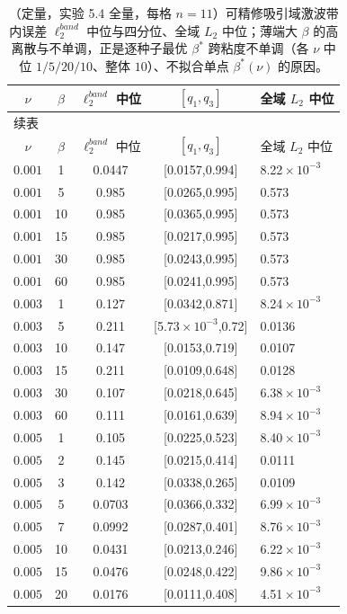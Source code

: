 \documentclass[fontset=windows,11pt]{ctexart}
\numberwithin{equation}{section}
\begin{document}
\begin{longtable}{ccccl}
\caption{（定量，实验 5.4 全量，每格 $n=11$）可精修吸引域激波带内误差 $\ell_2^{band}$ 中位与四分位、全域 $L_2$ 中位；薄端大 $\beta$ 的高离散与不单调，正是逐种子最优 $\beta^*$ 跨粘度不单调（各 $\nu$ 中位 $1/5/20/10$、整体 $10$）、不拟合单点 $\beta^*(\nu)$ 的原因。}\label{tab:app-e1}\\
\toprule
$\nu$&$\beta$&$\ell_2^{band}$ 中位&$[q_1,q_3]$&全域 $L_2$ 中位\\\midrule\endfirsthead
\multicolumn{5}{l}{\small 续表}\\\toprule
$\nu$&$\beta$&$\ell_2^{band}$ 中位&$[q_1,q_3]$&全域 $L_2$ 中位\\\midrule\endhead
$0.001$ & 1 & 0.0447 & [0.0157,0.994] & 8.22$\!\times\!10^{-3}$ \\
$0.001$ & 5 & 0.985 & [0.0265,0.995] & 0.573 \\
$0.001$ & 10 & 0.985 & [0.0365,0.995] & 0.573 \\
$0.001$ & 15 & 0.985 & [0.0217,0.995] & 0.573 \\
$0.001$ & 30 & 0.985 & [0.0243,0.995] & 0.573 \\
$0.001$ & 60 & 0.985 & [0.0241,0.995] & 0.573 \\
$0.003$ & 1 & 0.127 & [0.0342,0.871] & 8.24$\!\times\!10^{-3}$ \\
$0.003$ & 5 & 0.211 & [5.73$\!\times\!10^{-3}$,0.72] & 0.0136 \\
$0.003$ & 10 & 0.147 & [0.0153,0.719] & 0.0107 \\
$0.003$ & 15 & 0.211 & [0.0109,0.648] & 0.0128 \\
$0.003$ & 30 & 0.107 & [0.0218,0.645] & 6.38$\!\times\!10^{-3}$ \\
$0.003$ & 60 & 0.111 & [0.0161,0.639] & 8.94$\!\times\!10^{-3}$ \\
$0.005$ & 1 & 0.105 & [0.0225,0.523] & 8.40$\!\times\!10^{-3}$ \\
$0.005$ & 2 & 0.145 & [0.0215,0.414] & 0.0111 \\
$0.005$ & 3 & 0.142 & [0.0338,0.265] & 0.0109 \\
$0.005$ & 5 & 0.0703 & [0.0366,0.332] & 6.99$\!\times\!10^{-3}$ \\
$0.005$ & 7 & 0.0992 & [0.0287,0.401] & 8.76$\!\times\!10^{-3}$ \\
$0.005$ & 10 & 0.0431 & [0.0213,0.246] & 6.22$\!\times\!10^{-3}$ \\
$0.005$ & 15 & 0.0476 & [0.0248,0.422] & 9.86$\!\times\!10^{-3}$ \\
$0.005$ & 20 & 0.0176 & [0.0111,0.408] & 4.51$\!\times\!10^{-3}$ \\

\end{longtable}
\end{document}
